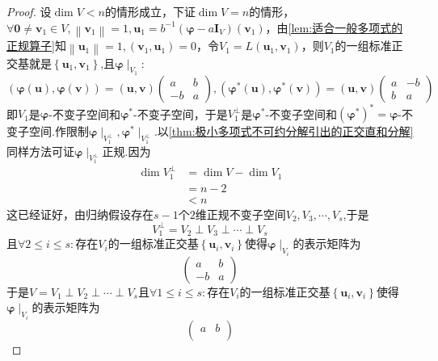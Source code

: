 {\begin{proof}
        设$\dim V<n$的情形成立，下证$\dim V=n$的情形，$\forall\bm{0}\neq\bm{v}_1\in V,\left\lVert\bm{v}_1\right\rVert=1,\bm{u}_1=b^{-1}\left(\bm{\varphi}-a\bm{I}_V\right)\left(\bm{v}_1\right)$，由\cref{lem:适合一般多项式的正规算子}知$\left\lVert\bm{u}_1\right\rVert=1,\left(
            \bm{v}_1,\bm{u}_1
            \right)=0$，令$V_1=L\left(\bm{u}_1,\bm{v}_1\right)$，则$V_1$的一组标准正交基就是$\left\{\bm{u}_1,\bm{v}_1\right\}$,且$\bm{\varphi}\mid_{V_1}:$\[
            \left(
            \bm{\varphi}\left(\bm{u}\right),\bm{\varphi}\left(\bm{v}\right)
            \right)=\left(\bm{u},\bm{v}\right)\begin{pmatrix}
                a  & b \\
                -b & a
            \end{pmatrix},\left(
            \bm{\varphi}^*\left(\bm{u}\right),\bm{\varphi}^*\left(\bm{v}\right)
            \right)=\left(\bm{u},\bm{v}\right)\begin{pmatrix}
                a & -b \\
                b & a
            \end{pmatrix}
        \]即$V_1$是$\bm{\varphi}$-不变子空间和$\bm{\varphi}^*$-不变子空间，于是$V_1^{\perp}$是$\bm{\varphi}^*$-不变子空间和$\left(\bm{\varphi}^*\right)^*= \bm{\varphi}$-不变子空间.作限制$\bm{\varphi}\mid_{V_1^{\perp}},\bm{\varphi}^*\mid_{V_1^{\perp}}$.以\cref{thm:极小多项式不可约分解引出的正交直和分解}同样方法可证$\bm{\varphi}\mid_{V_1^{\perp}}$正规.因为\begin{align*}
            \dim V_1^{\perp} & =\dim V-\dim V_1 \\
                             & =n-2             \\
                             & <n
        \end{align*}
        这已经证好，由归纳假设存在$s-1$个$2$维正规不变子空间$V_2,V_3,\cdots,V_s$,于是\[V_1^{\perp}=V_2\perp V_3\perp\cdots\perp V_s\]且$\forall2\leqslant i\leqslant s:$存在$V_i$的一组标准正交基$\left\{\bm{u}_i,\bm{v}_i\right\}$使得$\bm{\varphi}\mid_{V_i}$的表示矩阵为\[
            \begin{pmatrix}
                a  & b \\
                -b & a
            \end{pmatrix}
        \]于是$V=V_1\perp V_2\perp\cdots\perp V_s$且$\forall1\leqslant i\leqslant s:$存在$V_i$的一组标准正交基$\left\{\bm{u}_i,\bm{v}_i\right\}$使得$\bm{\varphi}\mid_{V_i}$的表示矩阵为\[
            \begin{pmatrix}
                a  & b \\

\end{pmatrix}\]
\end{proof}}
